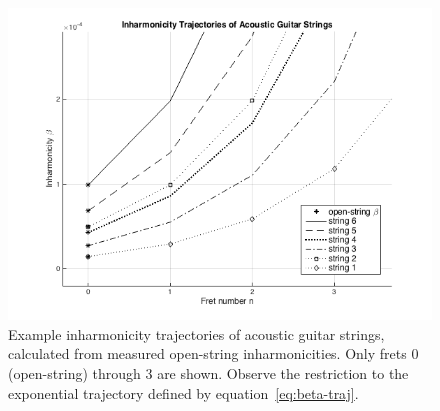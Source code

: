 \documentclass[12pt]{cmuthesis}
\begin{document}
\begin{figure}[h] 
\centering
\includegraphics[scale=0.70]{beta-trajectories-ag}
\caption{Example inharmonicity trajectories of acoustic guitar strings, calculated from measured open-string inharmonicities. Only frets 0 (open-string) through 3 are shown. Observe the restriction to the exponential trajectory defined by equation~\eqref{eq:beta-traj}.}
\label{fig:beta-trajectories-ag}
\end{figure}
\end{document}
